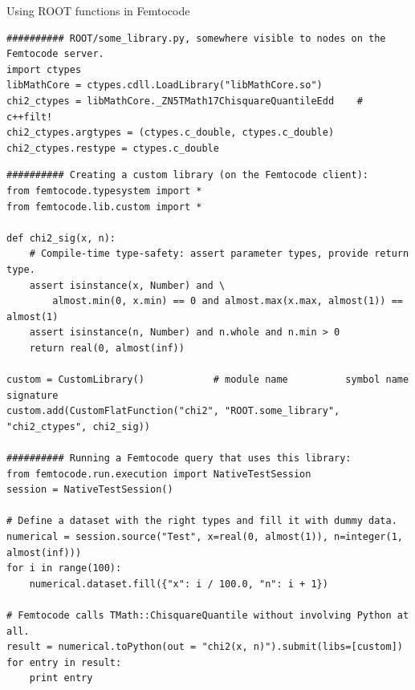 \documentclass{beamer}
\begin{document}
\begin{frame}[fragile]{Using ROOT functions in Femtocode}
\vspace{0.1 cm}
\tiny
\begin{verbatim}
########## ROOT/some_library.py, somewhere visible to nodes on the Femtocode server.
import ctypes
libMathCore = ctypes.cdll.LoadLibrary("libMathCore.so")
chi2_ctypes = libMathCore._ZN5TMath17ChisquareQuantileEdd    # c++filt!
chi2_ctypes.argtypes = (ctypes.c_double, ctypes.c_double)
chi2_ctypes.restype = ctypes.c_double
\end{verbatim}

\begin{verbatim}
########## Creating a custom library (on the Femtocode client):
from femtocode.typesystem import *
from femtocode.lib.custom import *

def chi2_sig(x, n):
    # Compile-time type-safety: assert parameter types, provide return type.
    assert isinstance(x, Number) and \
        almost.min(0, x.min) == 0 and almost.max(x.max, almost(1)) == almost(1)
    assert isinstance(n, Number) and n.whole and n.min > 0
    return real(0, almost(inf))

custom = CustomLibrary()            # module name          symbol name    signature
custom.add(CustomFlatFunction("chi2", "ROOT.some_library", "chi2_ctypes", chi2_sig))

########## Running a Femtocode query that uses this library:
from femtocode.run.execution import NativeTestSession
session = NativeTestSession()

# Define a dataset with the right types and fill it with dummy data.
numerical = session.source("Test", x=real(0, almost(1)), n=integer(1, almost(inf)))
for i in range(100):
    numerical.dataset.fill({"x": i / 100.0, "n": i + 1})

# Femtocode calls TMath::ChisquareQuantile without involving Python at all.
result = numerical.toPython(out = "chi2(x, n)").submit(libs=[custom])
for entry in result:
    print entry
\end{verbatim}
\end{frame}
\end{document}
